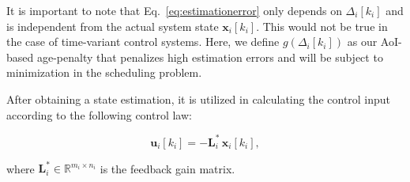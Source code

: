 It is important to note that Eq.~\eqref{eq:estimationerror} only depends on
$\Delta_i[k_i]$ and is independent from the actual system state
$\boldsymbol{x}_i[k_i]$. This would not be true in the case of time-variant
control systems. Here, we define $g(\Delta_i[k_i])$ as our AoI-based age-penalty
that penalizes high estimation errors and will be subject to minimization in the
scheduling problem.

After obtaining a state estimation, it is utilized in calculating the control
input according to the following control law:

\begin{equation}
  \label{eq:controllaw}
  \boldsymbol{u}_i[k_i] = - \boldsymbol{L}_i^* \,\boldsymbol{\hat{x}}_i[k_i],
\end{equation}

where $\boldsymbol{L}_i^* \in \mathbb{R}^{m_i \times n_i}$ is the feedback gain
matrix. 






